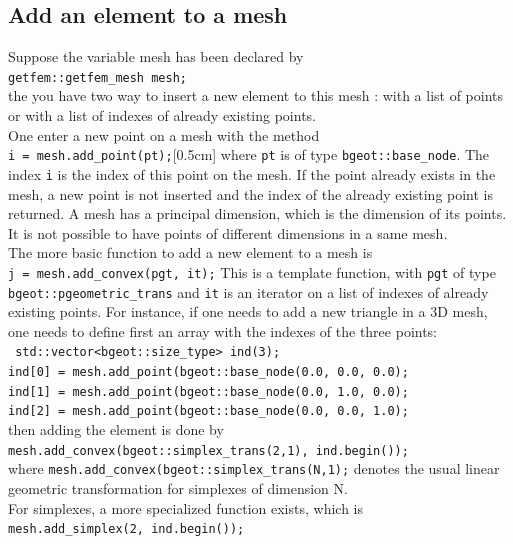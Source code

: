 \documentclass[11pt,a4paper]{article}
\begin{document}
\subsection{Add an element to a mesh}
Suppose the variable mesh has been declared by\\[0.5cm]
{\tt getfem::getfem\_mesh mesh;}\\[0.5cm]
the you have two way to insert a new element to this mesh : with a list of points or with a list of indexes of already existing points.\\[0.5cm]
One enter a new point on a mesh with the method\\[0.5cm]
{\tt i = mesh.add\_point(pt);}[0.5cm]
where {\tt pt} is of type {\tt bgeot::base\_node}. The index {\tt i} is the index of this point on the mesh. If the point already exists in the mesh, a new point is not inserted and the index of the already existing point is returned. A mesh has a principal dimension, which is the dimension of its points. It is not possible to have points of different dimensions in a same mesh.\\[0.5cm]
The more basic function to add a new element to a mesh is\\[0.5cm]
{\tt j = mesh.add\_convex(pgt, it);}
This is a template function, with {\tt pgt} of type {\tt bgeot::pgeometric\_trans} and {\tt it} is an iterator on a list of indexes of already existing points. For instance, if one needs to add a new triangle in a 3D mesh, one needs to define first an array with the indexes of the three points:\\[0.5cm]
{\tt 
  std::vector<bgeot::size\_type> ind(3); \\
  ind[0] = mesh.add\_point(bgeot::base\_node(0.0, 0.0, 0.0);\\
  ind[1] = mesh.add\_point(bgeot::base\_node(0.0, 1.0, 0.0);\\
  ind[2] = mesh.add\_point(bgeot::base\_node(0.0, 0.0, 1.0);
}\\[0.5cm]
then adding the element is done by
{\tt mesh.add\_convex(bgeot::simplex\_trans(2,1), ind.begin()); }\\[0.5cm]
where {\tt mesh.add\_convex(bgeot::simplex\_trans(N,1);} denotes the usual linear geometric transformation for simplexes of dimension N.\\[0.5cm]
For simplexes, a more specialized function exists, which is\\[0.5cm]
{\tt mesh.add\_simplex(2, ind.begin()); }\\[0.5cm]
\end{document}
